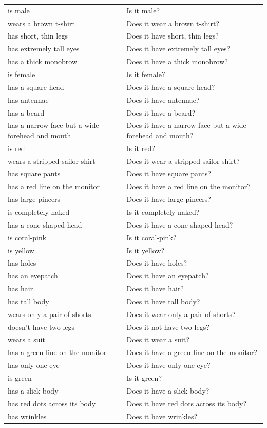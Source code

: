\documentclass[11pt]{article}
\begin{document}
\begin{center}
\begin{tabular}{ll}
is male & Is it male?\\[0pt]
wears a brown t-shirt & Does it wear a brown t-shirt?\\[0pt]
has short, thin legs & Does it have short, thin legs?\\[0pt]
has extremely tall eyes & Does it have extremely tall eyes?\\[0pt]
has a thick monobrow & Does it have a thick monobrow?\\[0pt]
is female & Is it female?\\[0pt]
has a square head & Does it have a square head?\\[0pt]
has antennae & Does it have antennae?\\[0pt]
has a beard & Does it have a beard?\\[0pt]
has a narrow face but a wide forehead and mouth & Does it have a narrow face but a wide forehead and mouth?\\[0pt]
is red & Is it red?\\[0pt]
wears a stripped sailor shirt & Does it wear a stripped sailor shirt?\\[0pt]
has square pants & Does it have square pants?\\[0pt]
has a red line on the monitor & Does it have a red line on the monitor?\\[0pt]
has large pincers & Does it have large pincers?\\[0pt]
is completely naked & Is it completely naked?\\[0pt]
has a cone-shaped head & Does it have a cone-shaped head?\\[0pt]
is coral-pink & Is it coral-pink?\\[0pt]
is yellow & Is it yellow?\\[0pt]
has holes & Does it have holes?\\[0pt]
has an eyepatch & Does it have an eyepatch?\\[0pt]
has hair & Does it have hair?\\[0pt]
has tall body & Does it have tall body?\\[0pt]
wears only a pair of shorts & Does it wear only a pair of shorts?\\[0pt]
doesn't have two legs & Does it not have two legs?\\[0pt]
wears a suit & Does it wear a suit?\\[0pt]
has a green line on the monitor & Does it have a green line on the monitor?\\[0pt]
has only one eye & Does it have only one eye?\\[0pt]
is green & Is it green?\\[0pt]
has a slick body & Does it have a slick body?\\[0pt]
has red dots across its body & Does it have red dots across its body?\\[0pt]
has wrinkles & Does it have wrinkles?\\[0pt]
\end{tabular}
\end{center}
\end{document}
